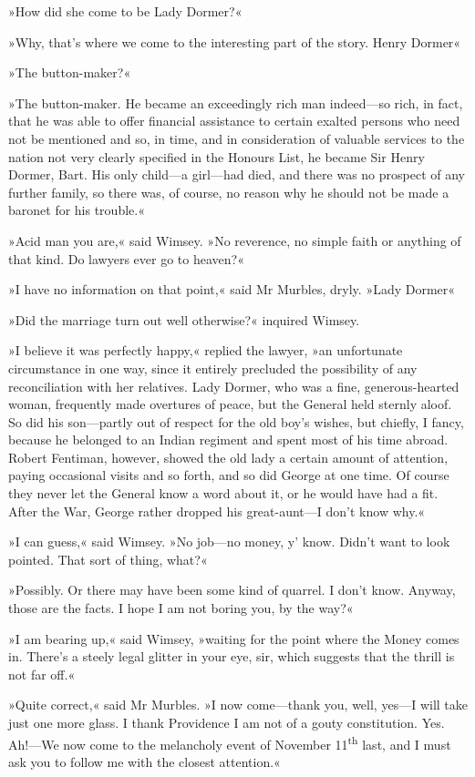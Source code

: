 »How did she come to be Lady Dormer?«

»Why, that's where we come to the interesting part of the story. Henry Dormer\longdash«

»The button-maker?«

»The button-maker. He became an exceedingly rich man indeed—so rich, in fact, that he was able to offer financial assistance to certain exalted persons who need not be mentioned and so, in time, and in consideration of valuable services to the nation not very clearly specified in the Honours List, he became Sir Henry Dormer, Bart. His only child—a girl—had died, and there was no prospect of any further family, so there was, of course, no reason why he should not be made a baronet for his trouble.«

»Acid man you are,« said Wimsey. »No reverence, no simple faith or anything of that kind. Do lawyers ever go to heaven?«

»I have no information on that point,« said Mr Murbles, dryly. »Lady Dormer\longdash«

»Did the marriage turn out well otherwise?« inquired Wimsey.

»I believe it was perfectly happy,« replied the lawyer, »an unfortunate circumstance in one way, since it entirely precluded the possibility of any reconciliation with her relatives. Lady Dormer, who was a fine, generous-hearted woman, frequently made overtures of peace, but the General held sternly aloof. So did his son—partly out of respect for the old boy's wishes, but chiefly, I fancy, because he belonged to an Indian regiment and spent most of his time abroad. Robert Fentiman, however, showed the old lady a certain amount of attention, paying occasional visits and so forth, and so did George at one time. Of course they never let the General know a word about it, or he would have had a fit. After the War, George rather dropped his great-aunt—I don't know why.«

»I can guess,« said Wimsey. »No job—no money, y' know. Didn't want to look pointed. That sort of thing, what?«

»Possibly. Or there may have been some kind of quarrel. I don't know. Anyway, those are the facts. I hope I am not boring you, by the way?«

»I am bearing up,« said Wimsey, »waiting for the point where the Money comes in. There's a steely legal glitter in your eye, sir, which suggests that the thrill is not far off.«

»Quite correct,« said Mr Murbles. »I now come—thank you, well, yes—I will take just one more glass. I thank Providence I am not of a gouty constitution. Yes. Ah!—We now come to the melancholy event of November 11\textsuperscript{th} last, and I must ask you to follow me with the closest attention.«

